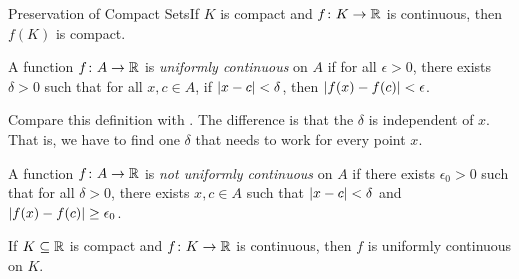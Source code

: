 \begin{ntheorem}
    {Preservation of Compact Sets}If \(K\) is compact and \(f \colon K \to \mathbb{R}\) is continuous, then \(f(K)\) is compact.
\end{ntheorem}


\begin{definition}
    A function \(f \colon A \to \mathbb{R}\) is \textit{uniformly continuous} on \(A\) if for all \(\epsilon > 0\), there exists \(\delta > 0\) such that for all \(x, c \in A\), if \(\left|x - c\right| < \delta\), then \(\left|f(x) - f(c)\right| < \epsilon\).
\end{definition}

Compare this definition with . The difference is that the \(\delta\) is independent of \(x\). That is, we have to find one \(\delta\) that needs to work for every point \(x\).



\begin{definition}
    A function \(f \colon A \to \mathbb{R}\) is \textit{not uniformly continuous} on \(A\) if there exists \(\epsilon_{0} > 0\) such that for all \(\delta > 0\), there exists \(x, c \in A\) such that \(\left|x - c\right| < \delta\) and \(\left|f(x) - f(c)\right| \geq \epsilon_{0}\).
\end{definition}

\begin{theorem}
    If \(K \subseteq \mathbb{R}\) is compact and \(f \colon K \to \mathbb{R}\) is continuous, then \(f\) is uniformly continuous on \(K\).
\end{theorem}

